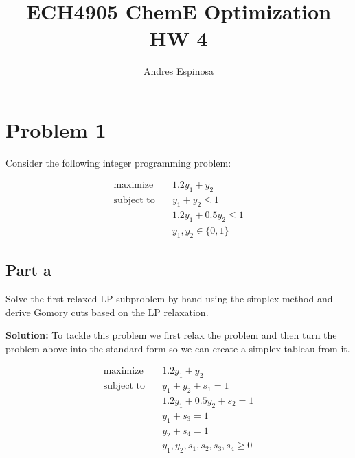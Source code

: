 \documentclass[11pt]{article}
\title{ECH4905 ChemE Optimization HW 4}
\author{Andres Espinosa}
\begin{document}
\maketitle

\section{Problem 1}
Consider the following integer programming problem:


\begin{align*}
  \text{maximize} & \quad 1.2y_1 + y_2 \\
  \text{subject to} & \quad y_1 + y_2 \leq 1 \\
  & \quad 1.2y_1 + 0.5y_2 \leq 1 \\
  & \quad y_1, y_2 \in \{ 0,1 \}
\end{align*}

\subsection{Part a}
\label{prob1parta}
Solve the first relaxed LP subproblem by hand using the simplex method and derive Gomory cuts based on the LP relaxation.

\textbf{Solution:} To tackle this problem we first relax the problem and then turn the problem above into the standard form so we can create a simplex tableau from it.

\begin{align*}
    \text{maximize} & \quad 1.2y_1 + y_2 \\
    \text{subject to} & \quad y_1 + y_2 + s_1= 1 \\
    & \quad 1.2y_1 + 0.5y_2 + s_2 = 1 \\
    & \quad y_1 + s_3 = 1 \\
    & \quad y_2 + s_4 = 1 \\
    & \quad y_1, y_2, s_1, s_2, s_3, s_4 \geq 0
\end{align*}
\end{document}
